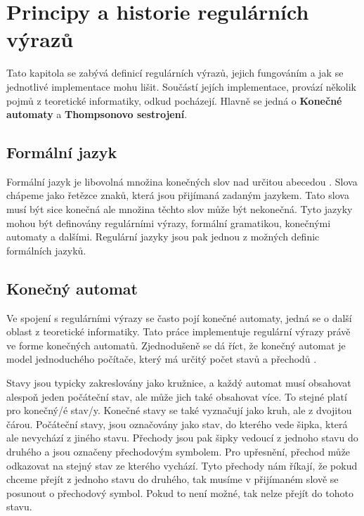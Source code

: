 \chapter{Principy a historie regulárních výrazů}\label{sec:Principle}

Tato kapitola se zabývá definicí regulárních výrazů, jejich fungováním a jak se jednotlivé implementace mohu lišit. 
Součástí jejích implementace, provází několik pojmů z teoretické informatiky, odkud pocházejí.
Hlavně se jedná o \textbf{Konečné automaty} a \textbf{Thompsonovo sestrojení}.

\section{Formální jazyk}
Formální jazyk je libovolná množina konečných slov nad určitou abecedou \cite{MUNIFL}. 
Slova chápeme jako řetězce znaků, která jsou přijímaná zadaným jazykem.
Tato slova musí být sice konečná ale množina těchto slov může být nekonečná. 
Tyto jazyky mohou být definovány regulárními výrazy, formální gramatikou,
konečnými automaty a dalšími. Regulární jazyky jsou pak jednou z možných definic formálních jazyků. 

\section{Konečný automat}\label{sec:FiniteAutomaton}
Ve spojení s regulárními výrazy se často pojí konečné automaty, jedná se o další oblast z teoretické informatiky.
Tato práce implementuje regulární výrazy právě ve forme konečných automatů.
Zjednodušeně se dá říct, že konečný automat je model jednoduchého počítače, který má určitý počet stavů a přechodů \cite{Havrlant}. 

Stavy jsou typicky zakreslovány jako kružnice, a každý automat musí obsahovat alespoň jeden počáteční stav, ale může jich také obsahovat více. 
To stejné platí pro konečný/é stav/y. 
Konečné stavy se také vyznačují jako kruh, ale z dvojitou čárou. 
Počáteční stavy, jsou označovány jako stav, do kterého vede šipka, která ale nevychází z jiného stavu.
Přechody jsou pak šipky vedoucí z jednoho stavu do druhého a jsou označeny přechodovým symbolem.
Pro upřesnění, přechod může odkazovat na stejný stav ze kterého vychází.
Tyto přechody nám říkají, že pokud chceme přejít z jednoho stavu do druhého, tak musíme v přijímaném slově se posunout o přechodový symbol. 
Pokud to není možné, tak nelze přejít do tohoto stavu.

